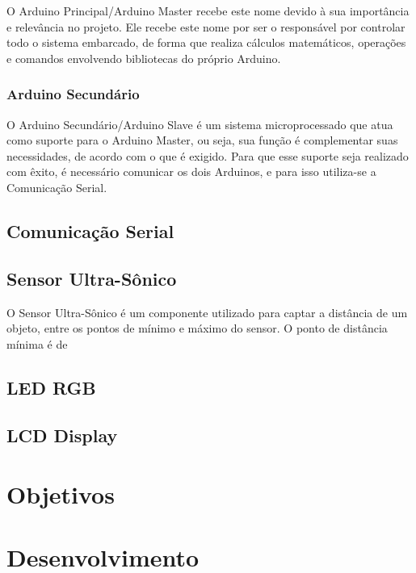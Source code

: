 \documentclass[conference]{IEEEtran}
\begin{document}
    O Arduino Principal/Arduino Master recebe este nome devido à sua importância e relevância no projeto.
Ele recebe este nome por ser o responsável por controlar todo o sistema embarcado, de forma que realiza
cálculos matemáticos, operações e comandos envolvendo bibliotecas do próprio Arduino.

\subsubsection{Arduino Secundário}

    O Arduino Secundário/Arduino Slave é um sistema microprocessado que atua como suporte para o 
Arduino Master, ou seja, sua função é complementar suas necessidades, de acordo com o que é exigido.
Para que esse suporte seja realizado com êxito, é necessário comunicar os dois Arduinos, e para isso
utiliza-se a Comunicação Serial.

\subsection{Comunicação Serial}



\subsection{Sensor Ultra-Sônico}

    O Sensor Ultra-Sônico é um componente utilizado para captar a distância de um objeto, entre os pontos 
de mínimo e máximo do sensor. O ponto de distância mínima é de 

\subsection{LED RGB}



\subsection{LCD Display}



\section{Objetivos}

\section{Desenvolvimento}
\end{document}
